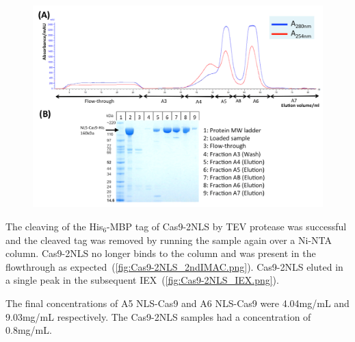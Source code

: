 \documentclass[11pt]{article}
\begin{document}
\begin{figure}[H]
  \centering
    \includegraphics[width=\textwidth]{NLS-Cas9_IEX.png}
    \label{fig:NLS-Cas9_IEX.png}
\end{figure}

The cleaving of the His$_{6}$-MBP tag of Cas9-2NLS by TEV protease was successful and the cleaved tag was removed by running the sample again over a Ni-NTA column.  Cas9-2NLS no longer binds to the column and was present in the flowthrough as expected~(\autoref{fig:Cas9-2NLS_2ndIMAC.png}). Cas9-2NLS eluted in a single peak in the subsequent IEX~(\autoref{fig:Cas9-2NLS_IEX.png}).

The final concentrations of A5 NLS-Cas9 and A6 NLS-Cas9 were 4.04mg/mL and 9.03mg/mL respectively. The Cas9-2NLS samples had a concentration of 0.8mg/mL.
\end{document}
